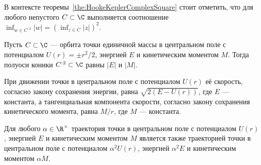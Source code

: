 \documentclass[
	extrafontsizes,
	11pt,
	hyphens,
]{memoir}
\begin{document}
\begin{remark}
В контексте теоремы~\ref{the:HookeKeplerComplexSquare} стоит отметить, что для любого непустого \(C \subset \C\) выполняется соотношение \(\inf_{w \in C^{:2}} \lvert w \rvert = (\inf_{z \in C} \lvert z \rvert)^2\).
\end{remark}

\begin{observation}
Пусть \(C \subset \C\) --- орбита точки единичной массы в центральном поле с потенциалом \(U(r) = \pm r^2 / 2\), энергией \(E\) и кинетическим моментом \(M\).%
\label{obs:HookeNewtonSemiaxes}
Тогда полуоси коники \(C^{:2} \subset \C\) равны \(\lvert E \rvert\) и \(\lvert M \rvert\).
\end{observation}

\begin{observation}
При движении точки в центральном поле с потенциалом \(U(r)\) её скорость, согласно закону сохранения энергии, равна \(\sqrt{2(E - U(r))}\), где \(E\) --- константа,%
\label{obs:CentFieldSpeed}
а тангенциальная компонента скорости, согласно закону сохранения кинетического момента, равна \(M/r\), где \(M\) --- константа.
\end{observation}

\begin{observation}
Для любого \(\alpha \in \R^{\times}\) траектория точки в центральном поле с потенциалом \(U(r)\), энергией \(E\) и кинетическим моментом \(M\)%
\label{obs:ScalingCentralField}
является также траекторией точки в центральном поле с потенциалом \(\alpha^2 U(r)\), энергией \(\alpha^2 E\) и кинетическим моментом \(\alpha M\).
\end{observation}


\end{document}
